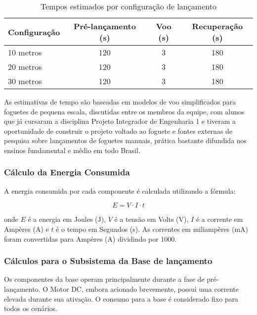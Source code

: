 \begin{table}[H]
	\centering
	\caption{Tempos estimados por configuração de lançamento}
	\label{tab:duracao_lancamento}
	\begin{tabular}{|l|c|c|c|}
		\hline
		Configuração & Pré-lançamento (s) & Voo (s) & Recuperação (s) \\
		\hline
		10 metros & 120 & 3 & 180 \\
		\hline
		20 metros & 120 & 3 & 180 \\
		\hline
		30 metros & 120 & 3 & 180 \\
		\hline
	\end{tabular}
\end{table}

As estimativas de tempo são baseadas em modelos de voo simplificados para foguetes de pequena escala, discutidas entre os membros da equipe, com alunos que já cursaram a disciplina Projeto Integrador de Engenharia 1 e tiveram a oportunidade de construir o projeto voltado ao foguete e fontes externas de pesquisa sobre lançamentos de foguetes manuais, prática bastante difundida nos ensinos fundamental e médio em todo Brasil. 

\subsubsection{Cálculo da Energia Consumida}

A energia consumida por cada componente é calculada utilizando a fórmula:

\begin{equation}
E = V \cdot I \cdot t
\end{equation}

onde $E$ é a energia em Joules (J), $V$ é a tensão em Volts (V), $I$ é a corrente em Ampères (A) e $t$ é o tempo em Segundos (s). As correntes em miliampères (mA) foram convertidas para Ampères (A) dividindo por 1000.

\subsubsection{Cálculos para o Subsistema da Base de lançamento}

Os componentes da base operam principalmente durante a fase de pré-lançamento. O Motor DC, embora acionado brevemente, possui uma corrente elevada durante sua ativação. O consumo para a base é considerado fixo para todos os cenários.

